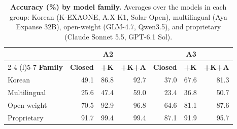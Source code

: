 \begin{table}[t]
\centering
\small
\setlength{\tabcolsep}{4pt}
\caption{\textbf{Accuracy (\%) by model family.}
Averages over the models in each group: Korean (K-EXAONE, A.X K1, Solar Open), multilingual (Aya Expanse 32B), open-weight (GLM-4.7, Qwen3.5), and proprietary (Claude Sonnet 5.5, GPT-6.1 Sol).}
\label{tab:by_family}
\begin{tabular}{@{}lrrrrrr@{}}
\toprule
 & \multicolumn{3}{c}{\textbf{A2}} & \multicolumn{3}{c}{\textbf{A3}} \\
\cmidrule(lr){2-4} \cmidrule(l){5-7}
\textbf{Family} & \textbf{Closed} & \textbf{+K} & \textbf{+K+A} & \textbf{Closed} & \textbf{+K} & \textbf{+K+A} \\
\midrule
Korean       & 49.1 & 86.8 & 92.7 & 37.0 & 67.6 & 81.3 \\
Multilingual & 25.6 & 47.4 & 59.0 & 23.4 & 36.8 & 50.7 \\
Open-weight  & 70.5 & 92.9 & 96.8 & 64.6 & 81.1 & 87.6 \\
Proprietary  & 91.7 & 99.4 & 99.4 & 87.1 & 91.9 & 95.7 \\
\bottomrule
\end{tabular}
\end{table}